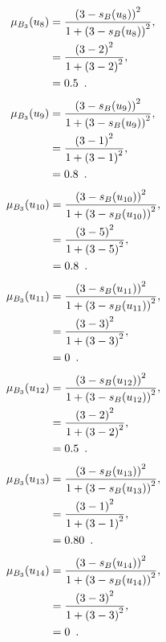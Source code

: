 \documentclass[a4paper,openany]{book}
\begin{document}
				\begin{align}
					\mu_{B_3}(u_8) &= \frac{\left(3-s_B(u_8)\right)^2}{1 + \left(3-s_B(u_8)\right)^2} ,\\
					&= \frac{\left(3-2\right)^2}{1 + \left(3-2\right)^2} \notag ,\\
					&= 0.5 \enspace. \notag
				\end{align}
				\begin{align}
					\mu_{B_3}(u_9) &= \frac{\left(3-s_B(u_9)\right)^2}{1 + \left(3-s_B(u_9)\right)^2} ,\\
					&= \frac{\left(3-1\right)^2}{1 + \left(3-1\right)^2} \notag ,\\
					&= 0.8 \enspace. \notag
				\end{align}
				\begin{align}
					\mu_{B_3}(u_{10}) &= \frac{\left(3-s_B(u_{10})\right)^2}{1 + \left(3-s_B(u_{10})\right)^2} ,\\
					&= \frac{\left(3-5\right)^2}{1 + \left(3-5\right)^2} \notag ,\\
					&= 0.8 \enspace. \notag
				\end{align}
				\begin{align}
					\mu_{B_3}(u_{11}) &= \frac{\left(3-s_B(u_{11})\right)^2}{1 + \left(3-s_B(u_{11})\right)^2} ,\\
					&= \frac{\left(3-3\right)^2}{1 + \left(3-3\right)^2} \notag ,\\
					&= 0 \enspace. \notag
				\end{align}
				\begin{align}
					\mu_{B_3}(u_{12}) &= \frac{\left(3-s_B(u_{12})\right)^2}{1 + \left(3-s_B(u_{12})\right)^2} ,\\
					&= \frac{\left(3-2\right)^2}{1 + \left(3-2\right)^2} \notag ,\\
					&= 0.5 \enspace. \notag
				\end{align}
				\begin{align}
					\mu_{B_3}(u_{13}) &= \frac{\left(3-s_B(u_{13})\right)^2}{1 + \left(3-s_B(u_{13})\right)^2} ,\\
					&= \frac{\left(3-1\right)^2}{1 + \left(3-1\right)^2} \notag ,\\
					&= 0.80 \enspace. \notag
				\end{align}
				\begin{align}
					\mu_{B_3}(u_{14}) &= \frac{\left(3-s_B(u_{14})\right)^2}{1 + \left(3-s_B(u_{14})\right)^2} ,\\
					&= \frac{\left(3-3\right)^2}{1 + \left(3-3\right)^2} \notag ,\\
					&= 0 \enspace. \notag
				\end{align}
\end{document}
